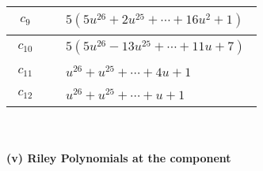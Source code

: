 \documentclass[1p]{elsarticle_modified}
\theoremstyle{definition}
\begin{document}
\begin{tabular}{m{50pt}|m{274pt}}
\hline $$\begin{aligned}c_{9}\end{aligned}$$&$\begin{aligned}
&5(5 u^{26}+2 u^{25}+\cdots+16 u^2+1)
\end{aligned}$\\
\hline $$\begin{aligned}c_{10}\end{aligned}$$&$\begin{aligned}
&5(5 u^{26}-13 u^{25}+\cdots+11 u+7)
\end{aligned}$\\
\hline $$\begin{aligned}c_{11}\end{aligned}$$&$\begin{aligned}
&u^{26}+u^{25}+\cdots+4 u+1
\end{aligned}$\\
\hline $$\begin{aligned}c_{12}\end{aligned}$$&$\begin{aligned}
&u^{26}+u^{25}+\cdots+u+1
\end{aligned}$\\
\hline
\end{tabular}\\~\\
\newpage\renewcommand{\arraystretch}{1}
\flushleft \textbf{(v) Riley Polynomials at the component}\newline \\
\end{document}
